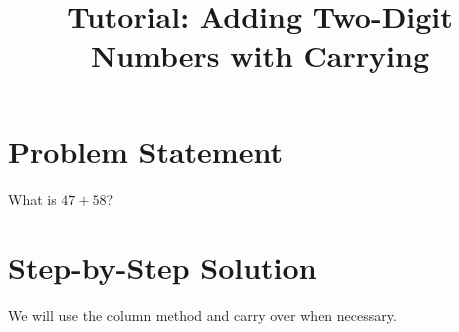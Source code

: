 \documentclass{article}
\begin{document}
\title{Tutorial: Adding Two-Digit Numbers with Carrying}
\author{}
\date{}
\maketitle

\section*{Problem Statement}
What is $47 + 58$?

\section*{Step-by-Step Solution}

We will use the column method and carry over when necessary.
\end{document}
